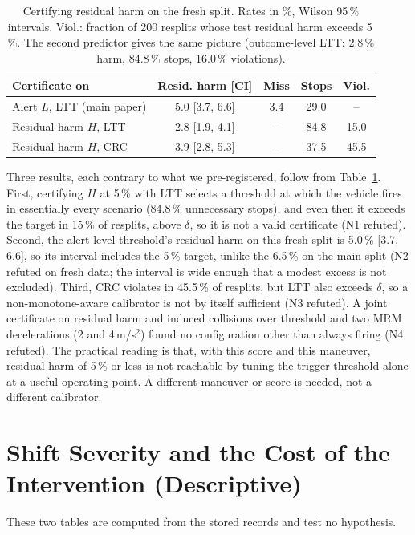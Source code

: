 \documentclass[lettersize,journal]{IEEEtran}
\begin{document}
\begin{table}[h]
\caption{Certifying residual harm on the fresh split. Rates in \%, Wilson
95\,\% intervals. Viol.: fraction of 200 resplits whose test residual
harm exceeds 5\,\%. The second predictor gives the same picture
(outcome-level LTT: 2.8\,\% harm, 84.8\,\% stops, 16.0\,\% violations).}
\label{tab:outcome}
\centering
\scriptsize\setlength{\tabcolsep}{2.5pt}
\begin{tabular}{lcccc}
\toprule
Certificate on & Resid. harm [CI] & Miss & Stops & Viol. \\
\midrule
Alert $L$, LTT (main paper) & 5.0 [3.7, 6.6] & 3.4 & 29.0 & -- \\
Residual harm $H$, LTT & 2.8 [1.9, 4.1] & -- & 84.8 & 15.0 \\
Residual harm $H$, CRC & 3.9 [2.8, 5.3] & -- & 37.5 & 45.5 \\
\bottomrule
\end{tabular}
\end{table}

Three results, each contrary to what we pre-registered, follow from
Table~\ref{tab:outcome}. First, certifying $H$ at 5\,\% with LTT selects a
threshold at which the vehicle fires in essentially every scenario (84.8\,\%
unnecessary stops), and even then it exceeds the target in 15\,\% of
resplits, above $\delta$, so it is not a valid certificate (N1 refuted).
Second, the alert-level threshold's residual harm on this fresh split is
5.0\,\% [3.7, 6.6], so its interval includes the 5\,\% target, unlike the
6.5\,\% on the main split (N2 refuted on fresh data; the interval is
wide enough that a modest excess is not excluded). Third, CRC violates in
45.5\,\% of resplits, but LTT also exceeds $\delta$, so a
non-monotone-aware calibrator is not by itself sufficient (N3 refuted). A
joint certificate on residual harm and induced collisions over threshold
and two MRM decelerations (2 and 4\,m/s$^2$) found no configuration other
than always firing (N4 refuted). The practical reading is that, with this
score and this maneuver, residual harm of 5\,\% or less is not reachable
by tuning the trigger threshold alone at a useful operating point. A
different maneuver or score is needed, not a different calibrator.

\section{Shift Severity and the Cost of the Intervention (Descriptive)}
\label{sec:s-cost}
These two tables are computed from the stored records and test no
hypothesis.
\end{document}

